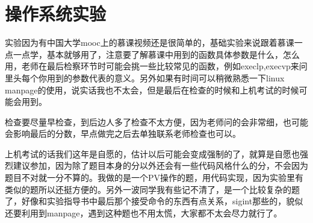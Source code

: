 \documentclass[UTF8]{ctexart}  %
\begin{document}
\section{操作系统实验}
\large{实验因为有中国大学mooc上的慕课视频还是很简单的，基础实验来说跟着慕课一点一点学，基本就够用了，注意要了解慕课中用到的函数具体参数是什么，怎么用，老师在最后检察环节时可能会挑一些比较常见的函数，例如execlp,execvp来问里头每个你用到的参数代表的意义。另外如果有时间可以稍微熟悉一下linux manpage的使用，说实话我也不太会，但是最后在检查的时候和上机考试的时候可能会用到。

检查要尽量早检查，到后边人多了检查不太方便，因为老师问的会非常细，也可能会影响最后的分数，早点做完之后去单独联系老师检查也可以。

上机考试的话我们这年是自愿的，估计以后可能会变成强制的了，就算是自愿也强烈建议参加，因为除了题目本身的分以外还会有一些代码风格什么的分，不会因为题目不对就一分不算的。我做的是一个PV操作的题，用代码实现，因为实验里有类似的题所以还挺方便的。另外一波同学我有些记不清了，是一个比较复杂的题了，好像和实验指导书中最后那个接受命令的东西有点关系，sigint那些的，貌似还要利用到manpage，遇到这种题也不用太慌，大家都不太会尽力就行了。}

\newpage
\end{document}
